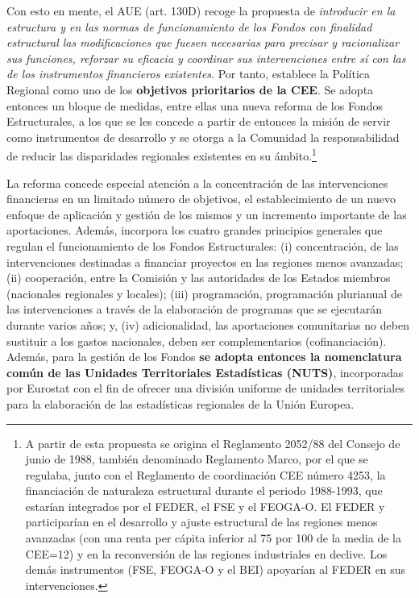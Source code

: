 \documentclass[10pt,a4paper]{article}
\begin{document}
Con esto en mente, el AUE (art. 130D) recoge la propuesta de \textit{introducir en la estructura y en las normas de funcionamiento de los Fondos con finalidad estructural las modificaciones que fuesen necesarias para precisar y racionalizar sus funciones, reforzar su eficacia y coordinar sus intervenciones entre sí con las de los instrumentos financieros existentes}. Por tanto, establece la Política Regional como uno de los \textbf{objetivos prioritarios de la CEE}. Se adopta entonces un bloque de medidas, entre ellas una nueva reforma de los Fondos Estructurales, a los que se les concede a partir de entonces la misión de servir como instrumentos de desarrollo y se otorga a la Comunidad la responsabilidad de reducir las disparidades regionales existentes en su ámbito.\footnote{%
    A partir de esta propuesta se origina el Reglamento 2052/88 del Consejo de junio de 1988, también denominado Reglamento Marco, por el que se regulaba, junto con el Reglamento de coordinación CEE número 4253, la financiación de naturaleza estructural durante el periodo 1988-1993, que estarían integrados por el FEDER, el FSE y el FEOGA-O. El FEDER y participarían en el desarrollo y ajuste estructural de las regiones menos avanzadas (con una renta per cápita inferior al 75 por 100 de la media de la CEE=12) y en la reconversión de las regiones industriales en declive. Los demás instrumentos (FSE, FEOGA-O y el BEI) apoyarían al FEDER en sus intervenciones.
}
    
La reforma concede especial atención a la concentración de las intervenciones financieras en un limitado número de objetivos, el establecimiento de un nuevo enfoque de aplicación y gestión de los mismos y un incremento importante de las aportaciones. Además, incorpora los cuatro grandes principios generales que regulan el funcionamiento de los Fondos Estructurales: (i) concentración, de las intervenciones destinadas a financiar proyectos en las regiones menos avanzadas; (ii) cooperación, entre la Comisión y las autoridades de los Estados miembros (nacionales regionales y locales); (iii) programación, programación plurianual de las intervenciones a través de la elaboración de programas que se ejecutarán durante varios años; y, (iv) adicionalidad, las aportaciones comunitarias no deben sustituir a los gastos nacionales, deben ser complementarios (cofinanciación). Además, para la gestión de los Fondos \textbf{se adopta entonces la nomenclatura común de las Unidades Territoriales Estadísticas (NUTS)}, incorporadas por Eurostat con el fin de ofrecer una división uniforme de unidades territoriales para la elaboración de las estadísticas regionales de la Unión Europea. 
\end{document}
